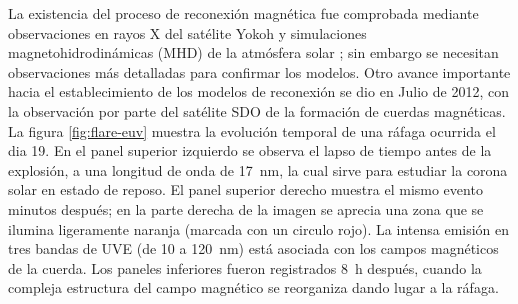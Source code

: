 La existencia del proceso de reconexión magnética fue comprobada mediante observaciones en rayos X del satélite Yokoh \cite{masuda,tsuneta} y simulaciones magnetohidrodinámicas (MHD) de la atmósfera solar  \cite{yokoyama}; sin embargo se necesitan observaciones más detalladas para confirmar los modelos. Otro avance importante hacia el establecimiento de los modelos de reconexión se dio en Julio de \num{2012}, con la observación por parte del satélite SDO de la formación de cuerdas magnéticas. La figura \ref{fig:flare-euv} muestra la evolución temporal de una ráfaga ocurrida el dia \num{19}. En el panel superior izquierdo se observa el lapso de tiempo antes de la explosión, a una longitud de onda de \SI{17}{\nano\metre}, la cual sirve para estudiar la corona solar en estado de reposo. El panel superior derecho muestra el mismo evento minutos después; en la parte derecha de la imagen se aprecia una zona que se ilumina ligeramente naranja (marcada con un circulo rojo). La intensa emisión en tres bandas de UVE (de \num{10} a \SI{120}{\nano\metre}) está asociada con los campos magnéticos de la cuerda. Los paneles inferiores fueron registrados \SI{8}{\hour} después, cuando la compleja estructura del campo magnético se reorganiza dando lugar a la ráfaga.

